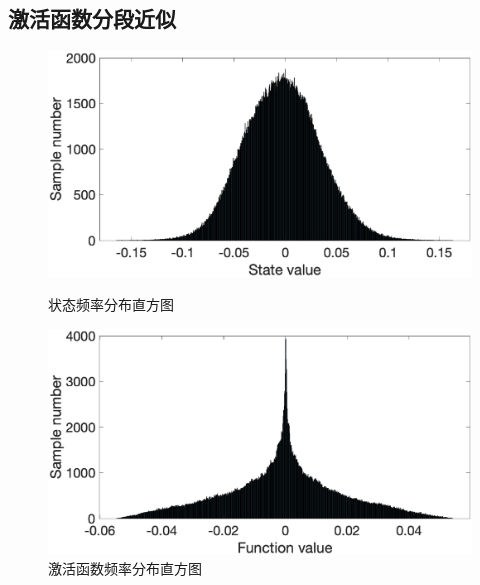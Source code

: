 \subsection{激活函数分段近似}
\begin{figure}
	\centering
	\begin{minipage}[t]{0.49\textwidth}
		\centering
		\includegraphics[width=1\columnwidth]{exp/fig_stateHist.eps}
		\caption{状态频率分布直方图}
		\label{fig:stateHist}
	\end{minipage}
	\begin{minipage}[t]{0.49\textwidth}
		\centering
		\includegraphics[width=1\columnwidth]{exp/fig_funcHist.eps}
		\caption{激活函数频率分布直方图}
		\label{fig:pfuncHist}
	\end{minipage}
\end{figure}



